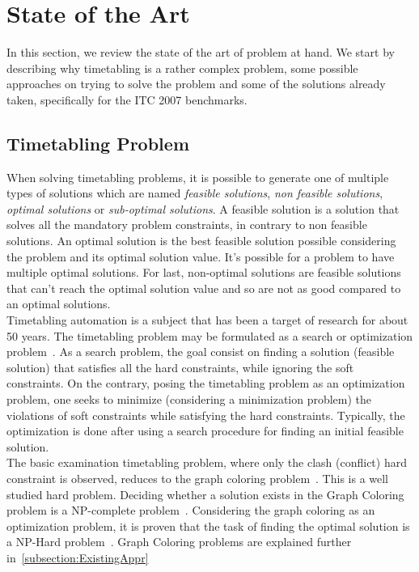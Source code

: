 \chapter{State of the Art}
\label{theory}
\thispagestyle{plain}

In this section, we review the state of the art of problem at hand. We start by describing why timetabling is a rather complex problem, some possible approaches on trying to solve the problem and some of the solutions already taken, specifically for the ITC 2007 benchmarks.\\

\section{Timetabling Problem}

When solving timetabling problems, it is possible to generate one of multiple types of solutions which are named \textit{feasible solutions}, \textit{non feasible solutions}, \textit{optimal solutions} or \textit{sub-optimal solutions}. A feasible solution is a solution that solves all the mandatory problem constraints, in contrary to non feasible solutions. An optimal solution is the best feasible solution possible considering the problem and its optimal solution value. It's possible for a problem to have multiple optimal solutions. For last, non-optimal solutions are feasible solutions that can't reach the optimal solution value and so are not as good compared to an optimal solutions.\\

Timetabling automation is a subject that has been a target of research for about 50 years. The timetabling problem may be formulated as a search or optimization problem~\cite{Schaerf1999}. As a search problem, the goal consist on finding a solution (feasible solution) that satisfies all the hard constraints, while ignoring the soft constraints. On the contrary, posing the timetabling problem as an optimization problem, one seeks to minimize (considering a minimization problem) the violations of soft constraints while satisfying the hard constraints. Typically, the optimization is done after using a search procedure for finding an initial feasible solution.\\

The basic examination timetabling problem, where only the clash (conflict) hard constraint is observed, reduces to the graph coloring problem~\cite{Jensen2001}. This is a well studied hard problem. Deciding whether a solution exists in the Graph Coloring problem is a NP-complete problem~\cite{Arora2009}. Considering the graph coloring as an optimization problem, it is proven that the task of finding the optimal solution is a NP-Hard problem~\cite{Arora2009}. Graph Coloring problems are explained further in~\ref{subsection:ExistingAppr}
\\

